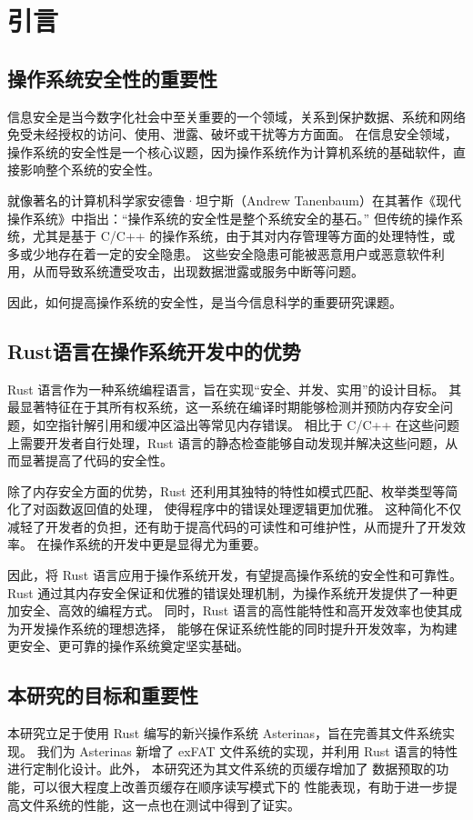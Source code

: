 
\chapter{引言}

\section{操作系统安全性的重要性}
信息安全\parencite{SOOMRO2016215}是当今数字化社会中至关重要的一个领域，关系到保护数据、系统和网络免受未经授权的访问、使用、泄露、破坏或干扰等方方面面。
在信息安全领域，操作系统的安全性是一个核心议题，因为操作系统作为计算机系统的基础软件，直接影响整个系统的安全性。

就像著名的计算机科学家安德鲁·坦宁斯（Andrew Tanenbaum）在其著作《现代操作系统》\parencite{tanenbaum2014modern}中指出：“操作系统的安全性是整个系统安全的基石。” 
但传统的操作系统，尤其是基于 C/C++ 的操作系统，由于其对内存管理等方面的处理特性，或多或少地存在着一定的安全隐患。
这些安全隐患可能被恶意用户或恶意软件利用，从而导致系统遭受攻击，出现数据泄露或服务中断等问题。

因此，如何提高操作系统的安全性，是当今信息科学的重要研究课题。

\section{Rust语言在操作系统开发中的优势}
Rust 语言\parencite{matsakis2014rust}作为一种系统编程语言，旨在实现“安全、并发、实用”的设计目标。
其最显著特征在于其所有权系统，这一系统在编译时期能够检测并预防内存安全问题，如空指针解引用和缓冲区溢出等常见内存错误。
相比于 C/C++ 在这些问题上需要开发者自行处理，Rust 语言的静态检查能够自动发现并解决这些问题，从而显著提高了代码的安全性。

除了内存安全方面的优势，Rust 还利用其独特的特性如模式匹配、枚举类型等简化了对函数返回值的处理，
使得程序中的错误处理逻辑更加优雅。
这种简化不仅减轻了开发者的负担，还有助于提高代码的可读性和可维护性，从而提升了开发效率。
在操作系统的开发中更是显得尤为重要。

因此，将 Rust 语言应用于操作系统开发，有望提高操作系统的安全性和可靠性。
Rust 通过其内存安全保证和优雅的错误处理机制，为操作系统开发提供了一种更加安全、高效的编程方式。
同时，Rust 语言的高性能特性和高开发效率也使其成为开发操作系统的理想选择，
能够在保证系统性能的同时提升开发效率，为构建更安全、更可靠的操作系统奠定坚实基础。

\section{本研究的目标和重要性}
本研究立足于使用 Rust 编写的新兴操作系统 Asterinas\parencite{Asterinas}，旨在完善其文件系统实现。
我们为 Asterinas 新增了 exFAT 文件系统\parencite{exFAT}\parencite{exFAT1}\parencite{exFAT2}的实现，并利用 Rust 语言的特性进行定制化设计。此外，
本研究还为其文件系统的页缓存\parencite{tanenbaum2014modern}\parencite{ostep}\parencite{bovet2005understanding}增加了
数据预取\parencite{readahead}\parencite{sequential_prefetching}的功能，可以很大程度上改善页缓存在顺序读写模式下的
性能表现，有助于进一步提高文件系统的性能，这一点也在测试中得到了证实。

